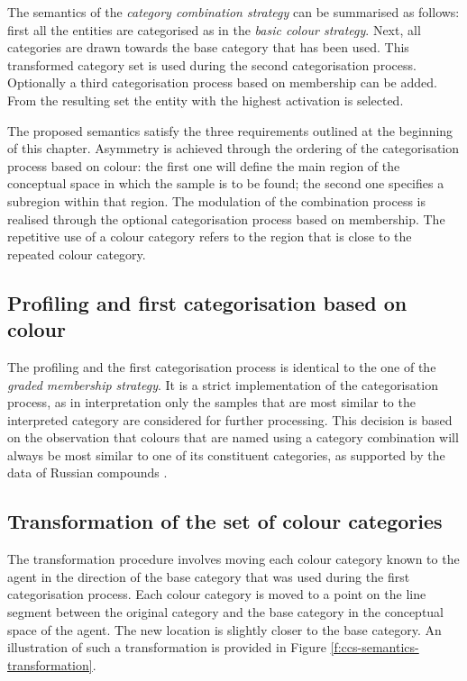 The semantics of the \emph{category combination strategy} can be
summarised as follows: first all the entities are categorised as in
the \emph{basic colour strategy}. Next, all categories are drawn
towards the base category that has been used. This transformed
category set is used during the second categorisation
process. Optionally a third categorisation process based on membership
can be added. From the resulting set the entity with the highest
activation is selected.

The proposed semantics satisfy the three requirements outlined at
the beginning of this chapter. Asymmetry is achieved through the
ordering of the categorisation process based on colour: the first one
will define the main region of the conceptual space in which the
sample is to be found; the second one specifies a subregion within
that region. The modulation of the combination process is realised
through the optional categorisation process based on membership. The
repetitive use of a colour category refers to the region that is close
to the repeated colour category.

\subsection{Profiling and first categorisation based on colour}

The profiling and the first categorisation process is identical to the
one of the \emph{graded membership strategy}. It is a strict
implementation of the categorisation process, as in interpretation
only the samples that are most similar to the interpreted category are
considered for further processing. This decision is based on the
observation that colours that are named using a category combination
will always be most similar to one of its constituent categories, as
supported by the data of Russian compounds \citep{safuanova07russian}.

\subsection{Transformation of the set of colour categories}

The transformation procedure involves moving each colour category
known to the agent in the direction of the base category that was used
during the first categorisation process. Each colour category is moved
to a point on the line segment between the original category and the
base category in the conceptual space of the agent. The new location
is slightly closer to the base category. An illustration of such a
transformation is provided in Figure
\ref{f:ccs-semantics-transformation}.

